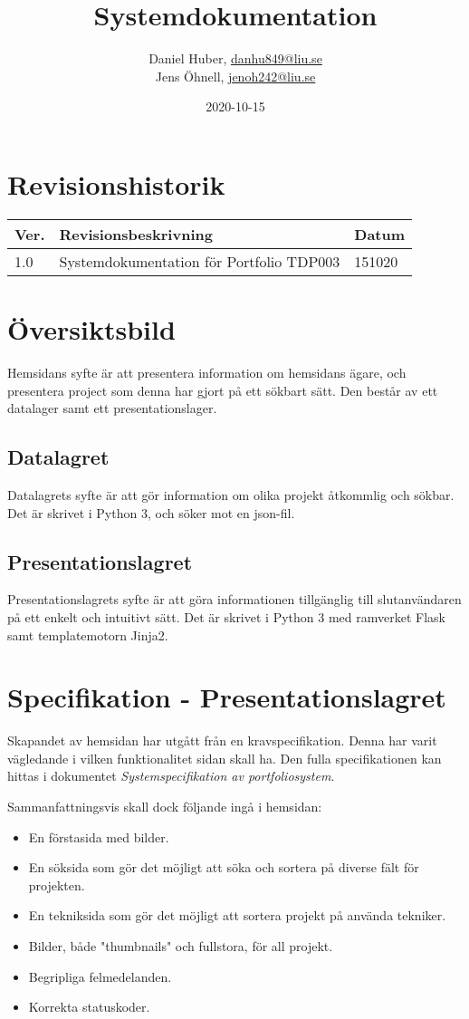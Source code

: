 \documentclass{TDP003mall}
\author{Daniel Huber, \url{danhu849@liu.se}\\
  Jens Öhnell, \url{jenoh242@liu.se}}
\title{Systemdokumentation}
\date{2020-10-15}
\begin{document}
\projectpage
\section{Revisionshistorik}
\begin{table}[!h]
\begin{tabularx}{\linewidth}{|l|X|l|}
\hline
Ver. & Revisionsbeskrivning & Datum \\\hline
1.0 & Systemdokumentation för Portfolio TDP003 & 151020 \\\hline
\end{tabularx}
\end{table}


\section{Översiktsbild}
Hemsidans syfte är att presentera information om hemsidans ägare, och presentera project som denna har gjort på ett sökbart sätt. Den består av ett datalager samt ett presentationslager.

\subsection{Datalagret}
Datalagrets syfte är att gör information om olika projekt åtkommlig och sökbar. Det är skrivet i Python 3, och söker mot en json-fil.

\subsection{Presentationslagret}
Presentationslagrets syfte är att göra informationen tillgänglig till slutanvändaren på ett enkelt och intuitivt sätt. Det är skrivet i Python 3 med ramverket Flask samt templatemotorn Jinja2.

\section{Specifikation - Presentationslagret}
Skapandet av hemsidan har utgått från en kravspecifikation. Denna har varit vägledande i vilken funktionalitet sidan skall ha. Den fulla specifikationen kan hittas i dokumentet \textit{Systemspecifikation av portfoliosystem}.

Sammanfattningsvis skall dock följande ingå i hemsidan:
\begin{itemize}
    \item En förstasida med bilder.
    \item En söksida som gör det möjligt att söka och sortera på diverse fält för projekten.
    \item En tekniksida som gör det möjligt att sortera projekt på använda tekniker.
    \item Bilder, både "thumbnails" och fullstora, för all projekt.
    \item Begripliga felmedelanden.
    \item Korrekta statuskoder.
\end{itemize}
\end{document}
